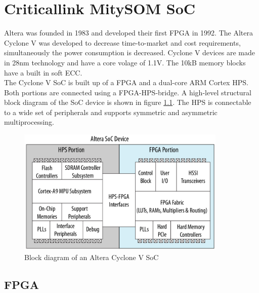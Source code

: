 \chapter{Criticallink MitySOM SoC}
Altera was founded in 1983 and developed their first FPGA in 1992.\cite{althist16} The Altera Cyclone V was developed to decrease time-to-market and cost requirements, simultaneously the power consumption is decreased. Cyclone V devices are made in 28nm technology and have a core volage of 1.1V. The 10kB memory blocks have a built in soft ECC.\cite{altcycvov15}\\
The Cyclone V SoC is built up of a FPGA and a dual-core ARM Cortex HPS. Both portions are connected using a FPGA-HPS-bridge. A high-level structural block diagram of the SoC device is shown in figure \ref{fig:alterasocblocks}. The HPS is connectable to a wide set of peripherals and supports symmetric and asymmetric multiprocessing.
\begin{figure}[htbp]
\begin{center}
\includegraphics[width=10cm,keepaspectratio=true]{bilder/png/AlteraSoC}
\caption{Block diagram of an Altera Cyclone V SoC\cite[chapter 1]{AlteraHPS15}}
\label{fig:alterasocblocks}
\end{center}
\end{figure}
\section{FPGA}


